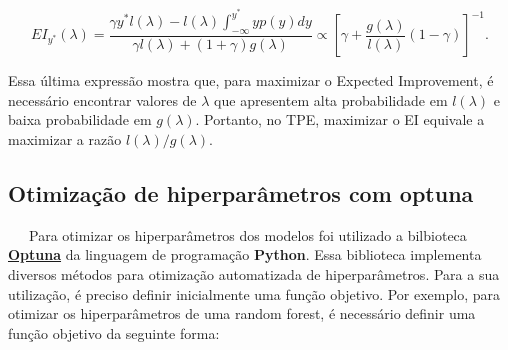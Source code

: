 \documentclass[
  12pt,
  a4paper,
]{scrreprt}
\begin{document}
\[
EI_{y^*}\left(\lambda\right) = \frac{\gamma y^* l\left(\lambda\right) - l\left(\lambda\right) \int_{-\infty}^{y^*} yp\left(y\right)dy}{\gamma l\left(\lambda\right) + \left(1 + \gamma\right)g\left(\lambda\right)} \propto \left[\gamma + \frac{g\left(\lambda\right)}{l\left(\lambda\right)} \left(1 - \gamma\right)\right]^{-1}\text{.}
\]

Essa última expressão mostra que, para maximizar o Expected Improvement,
é necessário encontrar valores de \(\lambda\) que apresentem alta
probabilidade em \(l\left(\lambda\right)\) e baixa probabilidade em
\(g\left(\lambda\right)\). Portanto, no TPE, maximizar o EI equivale a
maximizar a razão \(l\left(\lambda\right) / g\left(\lambda\right)\).

\subsection{Otimização de hiperparâmetros com
optuna}\label{otimizauxe7uxe3o-de-hiperparuxe2metros-com-optuna}

~~~Para otimizar os hiperparâmetros dos modelos foi utilizado a
bilbioteca \href{https://optuna.org/}{\textbf{Optuna}} da linguagem de
programação \textbf{Python}. Essa biblioteca implementa diversos métodos
para otimização automatizada de hiperparâmetros. Para a sua utilização,
é preciso definir inicialmente uma função objetivo. Por exemplo, para
otimizar os hiperparâmetros de uma random forest, é necessário definir
uma função objetivo da seguinte forma:
\end{document}
